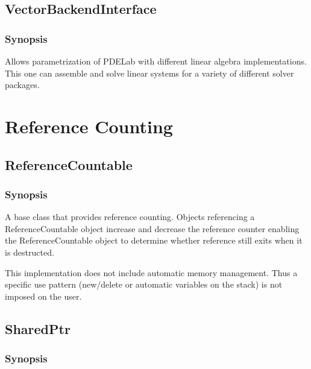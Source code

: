 \documentclass[11pt,a4paper,DIV11,%
notitlepage,oneside,abstracton,%
bibtotoc]{scrartcl}
\begin{document}
\subsection{VectorBackendInterface}

\subsubsection{Synopsis}

Allows parametrization of PDELab with different linear algebra
implementations. This one can assemble and solve linear systems for a
variety of different solver packages.


\section{Reference Counting}

\subsection{ReferenceCountable}

\subsubsection{Synopsis}

A base class that provides reference counting. Objects referencing a
ReferenceCountable object increase and decrease the reference counter
enabling the ReferenceCountable object to determine whether reference
still exits when it is destructed.

This implementation does not include automatic memory management. Thus
a specific use pattern (new/delete or automatic variables on the
stack) is not imposed on the user.

\subsection{SharedPtr}

\subsubsection{Synopsis}
\end{document}
